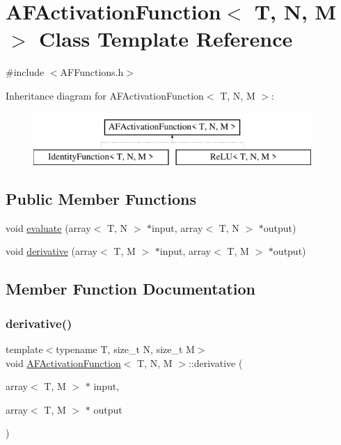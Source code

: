 \hypertarget{class_a_f_activation_function}{}\section{A\+F\+Activation\+Function$<$ T, N, M $>$ Class Template Reference}
\label{class_a_f_activation_function}


{\ttfamily \#include $<$A\+F\+Functions.\+h$>$}

Inheritance diagram for A\+F\+Activation\+Function$<$ T, N, M $>$\+:\begin{figure}[H]
\begin{center}
\leavevmode
\includegraphics[height=2.000000cm]{class_a_f_activation_function}
\end{center}
\end{figure}
\subsection*{Public Member Functions}
\begin{DoxyCompactItemize}
\item 
void \hyperlink{class_a_f_activation_function_adeaf0636a7bb08eb73d58f8cd663d9d8}{evaluate} (array$<$ T, N $>$ $\ast$input, array$<$ T, N $>$ $\ast$output)
\item 
void \hyperlink{class_a_f_activation_function_a2a60ee5d55ca4730c1808d050016c62e}{derivative} (array$<$ T, M $>$ $\ast$input, array$<$ T, M $>$ $\ast$output)
\end{DoxyCompactItemize}


\subsection{Member Function Documentation}
\mbox{\label{class_a_f_activation_function_a2a60ee5d55ca4730c1808d050016c62e}} 
\subsubsection{\texorpdfstring{derivative()}{derivative()}}
{\footnotesize\ttfamily template$<$typename T, size\+\_\+t N, size\+\_\+t M$>$ \\
void \hyperlink{class_a_f_activation_function}{A\+F\+Activation\+Function}$<$ T, N, M $>$\+::derivative (\begin{DoxyParamCaption}\item[{array$<$ T, M $>$ $\ast$}]{input,  }\item[{array$<$ T, M $>$ $\ast$}]{output }\end{DoxyParamCaption})\hspace{0.3cm}{\ttfamily [inline]}}

